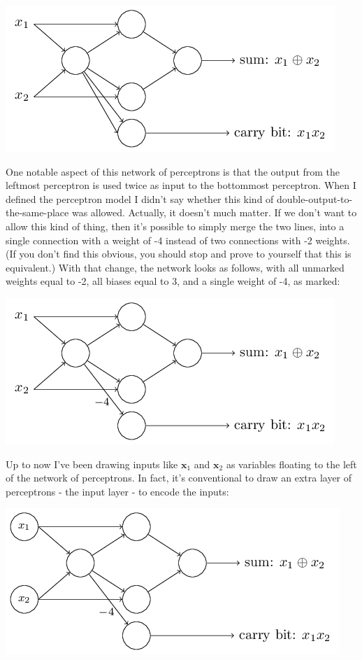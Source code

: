 \documentclass[a4paper,12pt]{report}%
\begin{document}
\begin{center}
 \includegraphics[width=0.8\linewidth]{images/tikz4.png}
\end{center}

One notable aspect of this network of perceptrons is that the output from the leftmost perceptron is used twice as input to the bottommost perceptron. When I defined the perceptron model I didn't say whether this kind of double-output-to-the-same-place was allowed. Actually, it doesn't much matter. If we don't want to allow this kind of thing, then it's possible to simply merge the two lines, into a single connection with a weight of -4 instead of two connections with -2 weights. (If you don't find this obvious, you should stop and prove to yourself that this is equivalent.) With that change, the network looks as follows, with all unmarked weights equal to -2, all biases equal to 3, and a single weight of -4, as marked:

\begin{center}
 \includegraphics[width=0.8\linewidth]{images/tikz5.png}
\end{center}


Up to now I've been drawing inputs like $\mathbf x_{1}$ and $\mathbf x_{2}$ as variables floating to the left of the network of perceptrons. In fact, it's conventional to draw an extra layer of perceptrons - the input layer - to encode the inputs:

\begin{center}
 \includegraphics[width=0.8\linewidth]{images/tikz6.png}
\end{center}
\end{document}
